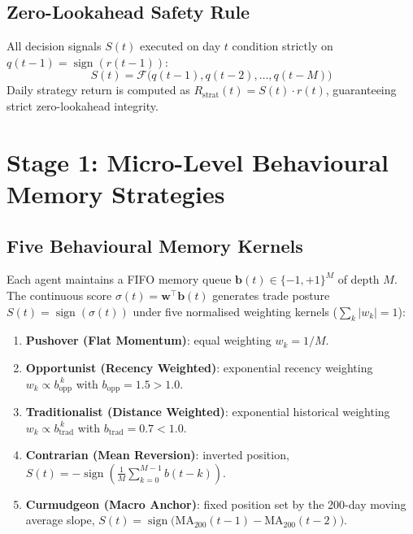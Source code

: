 \documentclass[10pt,twocolumn,twoside,a4paper]{article}
\DeclareMathOperator{\sign}{sign}
\begin{document}
\subsection{Zero-Lookahead Safety Rule}
All decision signals $S(t)$ executed on day $t$ condition strictly on
$q(t-1)=\sign(r(t-1))$:
\begin{equation}
    S(t) = \mathcal{F}\big( q(t-1), q(t-2), \dots, q(t-M) \big)
\end{equation}
Daily strategy return is computed as $R_{\text{strat}}(t)=S(t)\cdot r(t)$, guaranteeing strict
zero-lookahead integrity.

\section{Stage 1: Micro-Level Behavioural Memory Strategies}

\subsection{Five Behavioural Memory Kernels}
Each agent maintains a FIFO memory queue $\mathbf{b}(t)\in\{-1,+1\}^M$ of depth $M$. The continuous
score $\sigma(t)=\mathbf{w}^{\!\top}\mathbf{b}(t)$ generates trade posture $S(t)=\sign(\sigma(t))$
under five normalised weighting kernels ($\sum_k|w_k|=1$):
\begin{enumerate}
    \item \textbf{Pushover (Flat Momentum)}: equal weighting $w_k=1/M$.
    \item \textbf{Opportunist (Recency Weighted)}: exponential recency weighting
    $w_k\propto b_{\text{opp}}^{\,k}$ with $b_{\text{opp}}=1.5>1.0$.
    \item \textbf{Traditionalist (Distance Weighted)}: exponential historical weighting
    $w_k\propto b_{\text{trad}}^{\,k}$ with $b_{\text{trad}}=0.7<1.0$.
    \item \textbf{Contrarian (Mean Reversion)}: inverted position,
    $S(t)=-\sign\!\left(\frac{1}{M}\sum_{k=0}^{M-1}b(t-k)\right)$.
    \item \textbf{Curmudgeon (Macro Anchor)}: fixed position set by the 200-day moving average
    slope, $S(t)=\sign\!\big(\mathrm{MA}_{200}(t-1)-\mathrm{MA}_{200}(t-2)\big)$.
\end{enumerate}
\end{document}
